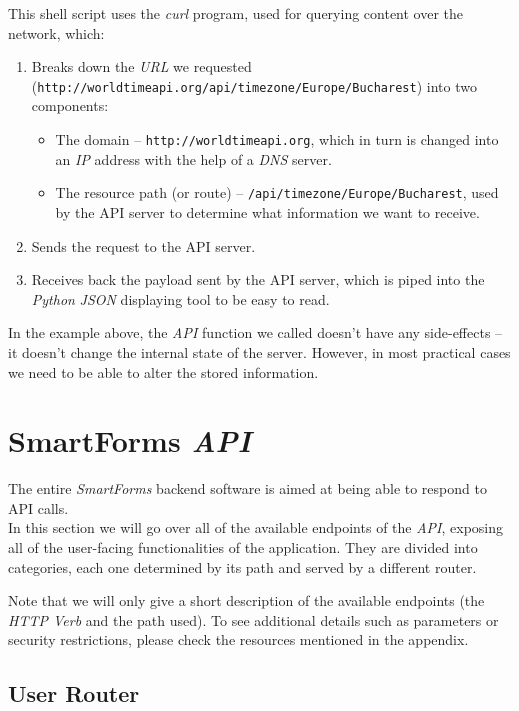 \documentclass[12pt, a4paper]{report}
\def\code#1{\texttt{#1}}
\begin{document}
This shell script uses the \textit{curl} program, used for querying content over the network, which:
\begin{enumerate}
    \item Breaks down the \textit{URL} we requested (\code{http://worldtimeapi.org/api/timezone/Europe/Bucharest}) into two components:
    \begin{itemize}
        \item The domain -- \code{http://worldtimeapi.org}, which in turn is changed into an \textit{IP} address with the help of a \textit{DNS} server.
        \item The resource path (or route) -- \code{/api/timezone/Europe/Bucharest}, used by the API server to determine what information we want to receive.
    \end{itemize}
    \item Sends the request to the API server.
    \item Receives back the payload sent by the API server, which is piped into the \textit{Python} \textit{JSON} displaying tool to be easy to read.
\end{enumerate}

In the example above, the \textit{API} function we called doesn't have any side-effects -- it doesn't change the internal state of the server. However, in most practical cases we need to be able to alter the stored information.

\section{SmartForms \textit{API}}

The entire \textit{SmartForms} backend software is aimed at being able to respond to API calls.\\
In this section we will go over all of the available endpoints of the \textit{API}, exposing all of the user-facing functionalities of the application. They are divided into categories, each one determined by its path and served by a different router.

Note that we will only give a short description of the available endpoints (the \textit{HTTP Verb} and the path used). To see additional details such as parameters or security restrictions, please check the resources mentioned in the appendix.

\subsection{User Router}
\end{document}
